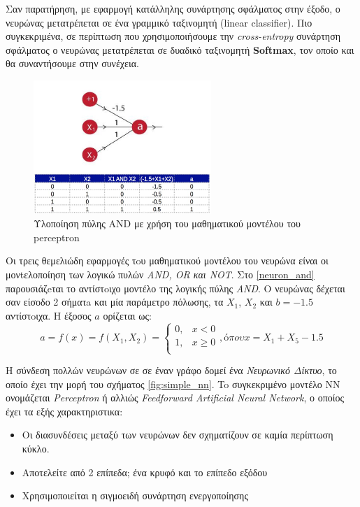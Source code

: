 Σαν παρατήρηση, με εφαρμογή κατάλληλης
συνάρτησης σφάλματος στην έξοδο, ο νευρώνας μετατρέπεται σε ένα  γραμμικό ταξινομητή
(linear classifier). Πιο συγκεκριμένα, σε περίπτωση που χρησιμοποιήσουμε την \emph{cross-entropy}
συνάρτηση σφάλματος ο νευρώνας μετατρέπεται σε δυαδικό ταξινομητή \textbf{Softmax},
τον οποίο και θα συναντήσουμε στην συνέχεια.

\begin{figure}[!ht]
  \centering
  \includegraphics[width=0.6\textwidth]{./images/chapter3/perceptron_and.jpg}
  \caption[Υλοποίηση πύλης AND με χρήση του μαθηματικού μοντέλου του perceptron]{Υλοποίηση πύλης AND με χρήση του μαθηματικού μοντέλου του perceptron}
  \label{fig:neuron_and}
\end{figure}

Οι τρεις θεμελιώδη εφαρμογές τoυ μαθηματικού μοντέλου του νευρώνα είναι οι
μονtελοποίηση των λογικώ πυλών \emph{AND, OR και NOT}. Στο \autoref{neuron_and}
παρουσιάζeται το αντίστoιχο μοντέλο της λογικής πύλης \emph{AND}. Ο νευρώνας
δέχεται σαν είσοδο 2 σήματa και μία παράμετρο πόλωσης,
τα $X_{1}$,  $X_{2}$ και $b=-1.5$ αντίστoιχα. Η έξοσος $a$ ορίζεται ως:
\[
  a = f(x) = f(X_{1}, X_{2}) =
  \begin{cases}
    0, & x < 0 \\
    1, & x \geq 0 \\
  \end{cases},  
  όπου x = X_{1} + X_{5} - 1.5
\]

H σύνδεση πολλών νευρώνων σε σε έναν γράφο δομεί ένα \emph{Νευρωνικό Δίκτυο},
το οποίο έχει την μορή του σχήματος \autoref{fig:simple_nn}.
To συγκεκριμένο μοντέλο ΝΝ ονομάζεται \emph{Perceptron} ή αλλιώς
\emph{Feedforward Artificial Neural Network}, ο οποίος έχει τα εξής χαρακτηριστικα:
\begin{itemize}
  \item{Οι διασυνδέσεις μεταξύ των νευρώνων δεν σχηματίζουν σε καμία περίπτωση κύκλο.}
  \item{Αποτελείτε από 2 επίπεδα; ένα κρυφό και το επίπεδο εξόδου}
  \item{Χρησιμοποιείται η σιγμοειδή συνάρτηση ενεργοποίησης}
\end{itemize}

